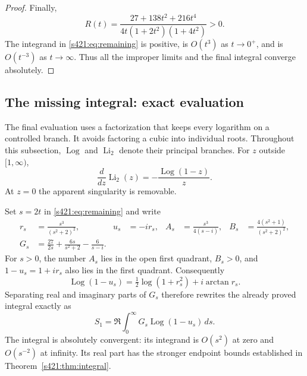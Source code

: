 \documentclass[11pt,a4paper]{article}
\theoremstyle{remark}\newtheorem{remark}[theorem]{Remark}
\numberwithin{equation}{section}
\begin{document}
\begin{proof}
Finally,
\[
 R(t)=\frac{27+138t^2+216t^4}
 {4t(1+2t^2)(1+4t^2)}>0.
\]
The integrand in \eqref{s421:eq:remaining} is positive, is $O(t^3)$ as $t\to0^+$, and is $O(t^{-3})$ as $t\to\infty$. Thus all the improper limits and the final integral converge absolutely.
\end{proof}


\subsection{The missing integral: exact evaluation}
The final evaluation uses a factorization that keeps every logarithm on
a controlled branch. It avoids factoring a cubic into individual roots.
Throughout this subsection, $\operatorname{Log}$ and $\operatorname{Li}_2$
denote their principal branches. For $z$ outside $[1,\infty)$,
\[
 \frac{d}{dz}\operatorname{Li}_2(z)=-\frac{\operatorname{Log}(1-z)}z.
\]
At $z=0$ the apparent singularity is removable.

Set $s=2t$ in \eqref{s421:eq:remaining} and write
\begin{align*}
 r_s&=\frac{s^3}{(s^2+2)^2},&
 u_s&=-i r_s,&
 A_s&=\frac{s^3}{4(s-i)},&
 B_s&=\frac{4(s^2+1)}{(s^2+2)^2},\\
 G_s&=\frac{27}{2s}+\frac{6s}{s^2+2}-\frac6{s-i}.
\end{align*}
For $s>0$, the number $A_s$ lies in the open first quadrant, $B_s>0$,
and $1-u_s=1+i r_s$ also lies in the first quadrant. Consequently
\[
 \operatorname{Log}(1-u_s)
 =\tfrac12\log(1+r_s^2)+i\arctan r_s.
\]
Separating real and imaginary parts of $G_s$ therefore rewrites the
already proved integral exactly as
\begin{equation}\label{s421:eq:s421-complex-integral}
 S_1=\Re\int_0^\infty G_s\operatorname{Log}(1-u_s)\,ds.
\end{equation}
The integral is absolutely convergent: its integrand is $O(s^2)$ at
zero and $O(s^{-2})$ at infinity. Its real part has the stronger
endpoint bounds established in Theorem~\ref{s421:thm:integral}.
\end{document}
